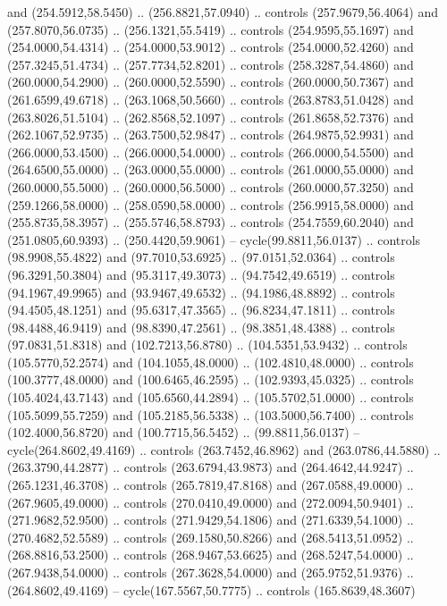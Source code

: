   and (254.5912,58.5450) .. (256.8821,57.0940) .. controls (257.9679,56.4064)
  and (257.8070,56.0735) .. (256.1321,55.5419) .. controls (254.9595,55.1697)
  and (254.0000,54.4314) .. (254.0000,53.9012) .. controls (254.0000,52.4260)
  and (257.3245,51.4734) .. (257.7734,52.8201) .. controls (258.3287,54.4860)
  and (260.0000,54.2900) .. (260.0000,52.5590) .. controls (260.0000,50.7367)
  and (261.6599,49.6718) .. (263.1068,50.5660) .. controls (263.8783,51.0428)
  and (263.8026,51.5104) .. (262.8568,52.1097) .. controls (261.8658,52.7376)
  and (262.1067,52.9735) .. (263.7500,52.9847) .. controls (264.9875,52.9931)
  and (266.0000,53.4500) .. (266.0000,54.0000) .. controls (266.0000,54.5500)
  and (264.6500,55.0000) .. (263.0000,55.0000) .. controls (261.0000,55.0000)
  and (260.0000,55.5000) .. (260.0000,56.5000) .. controls (260.0000,57.3250)
  and (259.1266,58.0000) .. (258.0590,58.0000) .. controls (256.9915,58.0000)
  and (255.8735,58.3957) .. (255.5746,58.8793) .. controls (254.7559,60.2040)
  and (251.0805,60.9393) .. (250.4420,59.9061) -- cycle(99.8811,56.0137) ..
  controls (98.9908,55.4822) and (97.7010,53.6925) .. (97.0151,52.0364) ..
  controls (96.3291,50.3804) and (95.3117,49.3073) .. (94.7542,49.6519) ..
  controls (94.1967,49.9965) and (93.9467,49.6532) .. (94.1986,48.8892) ..
  controls (94.4505,48.1251) and (95.6317,47.3565) .. (96.8234,47.1811) ..
  controls (98.4488,46.9419) and (98.8390,47.2561) .. (98.3851,48.4388) ..
  controls (97.0831,51.8318) and (102.7213,56.8780) .. (104.5351,53.9432) ..
  controls (105.5770,52.2574) and (104.1055,48.0000) .. (102.4810,48.0000) ..
  controls (100.3777,48.0000) and (100.6465,46.2595) .. (102.9393,45.0325) ..
  controls (105.4024,43.7143) and (105.6560,44.2894) .. (105.5702,51.0000) ..
  controls (105.5099,55.7259) and (105.2185,56.5338) .. (103.5000,56.7400) ..
  controls (102.4000,56.8720) and (100.7715,56.5452) .. (99.8811,56.0137) --
  cycle(264.8602,49.4169) .. controls (263.7452,46.8962) and (263.0786,44.5880)
  .. (263.3790,44.2877) .. controls (263.6794,43.9873) and (264.4642,44.9247) ..
  (265.1231,46.3708) .. controls (265.7819,47.8168) and (267.0588,49.0000) ..
  (267.9605,49.0000) .. controls (270.0410,49.0000) and (272.0094,50.9401) ..
  (271.9682,52.9500) .. controls (271.9429,54.1806) and (271.6339,54.1000) ..
  (270.4682,52.5589) .. controls (269.1580,50.8266) and (268.5413,51.0952) ..
  (268.8816,53.2500) .. controls (268.9467,53.6625) and (268.5247,54.0000) ..
  (267.9438,54.0000) .. controls (267.3628,54.0000) and (265.9752,51.9376) ..
  (264.8602,49.4169) -- cycle(167.5567,50.7775) .. controls (165.8639,48.3607)
